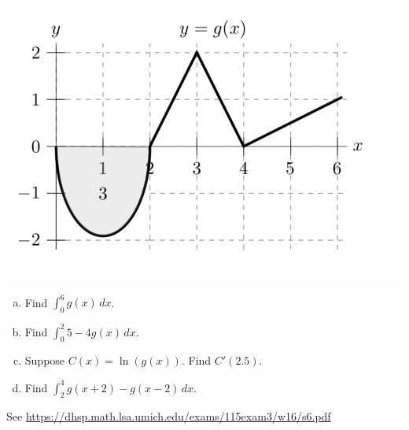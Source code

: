 \documentclass[11pt]{exam}
\begin{document}
\begin{questions}
\vspace{-1em}
\begin{center}
\includegraphics[scale=0.5]{Figures/graph2}
\end{center}
\begin{multicols}{2}
\begin{enumerate}[(a)]
	\item Find $\displaystyle\int_{0}^6 g(x) \, dx$.
	\item Find $\displaystyle\int_{0}^2 5 - 4g(x) \, dx$.	
	\item Suppose $C(x)=\ln(g(x))$. Find $C'(2.5).$
	\item Find $\displaystyle\int_{2}^4 g(x+2) - g(x-2) \, dx$.
	\end{enumerate}
	\end{multicols}
        \begin{solution}
          See \href{https://dhsp.math.lsa.umich.edu/exams/115exam3/w16/s6.pdf}{https://dhsp.math.lsa.umich.edu/exams/115exam3/w16/s6.pdf}
        \end{solution}

\end{questions}
\end{document}
